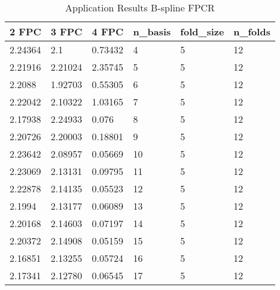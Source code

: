 \begin{table}[htb]
			\centering
			\caption{Application Results B-spline FPCR}
				\begin{tabular}{|lll|lll|}
\hline
2 FPC & 3 FPC & 4 FPC                        & \textbf{n\_basis} & \textbf{fold\_size} & \textbf{n\_folds} \\ \hline
2.24364                        & 2.1                            & 0.73432                       & 4       & 5         & 12      \\
2.21916                        & 2.21024                        & 2.35745                       & 5       & 5         & 12      \\
2.2088                         & 1.92703                        & 0.55305                       & 6       & 5         & 12      \\
2.22042                        & 2.10322                        & 1.03165                       & 7       & 5         & 12      \\
2.17938                        & 2.24933                        & 0.076                         & 8       & 5         & 12      \\
2.20726                        & 2.20003                        & 0.18801                       & 9       & 5         & 12      \\
2.23642                        & 2.08957                        & 0.05669                       & 10      & 5         & 12      \\
2.23069                        & 2.13131                        & 0.09795                       & 11      & 5         & 12      \\
2.22878                        & 2.14135                        & 0.05523                       & 12      & 5         & 12      \\
2.1994                         & 2.13177                        & 0.06089                       & 13      & 5         & 12      \\
2.20168                        & 2.14603                        & 0.07197                       & 14      & 5         & 12      \\
2.20372                        & 2.14908                        & 0.05159                       & 15      & 5         & 12      \\
2.16851                        & 2.13255                        & 0.05724                       & 16      & 5         & 12      \\
2.17341                        & 2.12780                        & 0.06545                       & 17      & 5         & 12      \\

\end{tabular}
\end{table}
